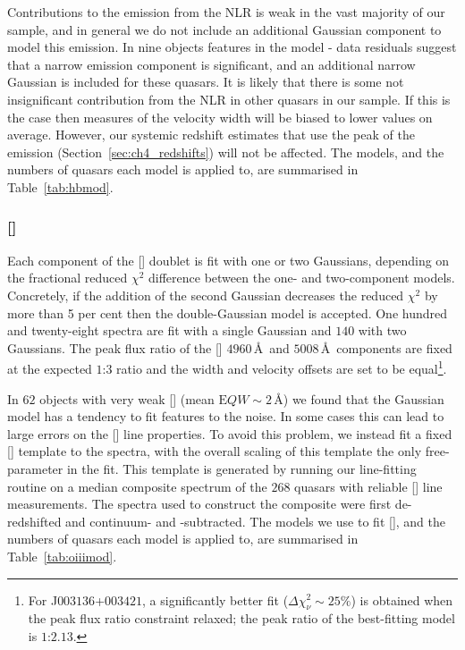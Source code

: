 Contributions to the \hb emission from the NLR is weak in the vast majority of our sample, and in general we do not include an additional Gaussian component to model this emission. 
In nine objects features in the model - data residuals suggest that a narrow emission component is significant, and an additional narrow Gaussian is included for these quasars. 
It is likely that there is some not insignificant contribution from the NLR in other quasars in our sample. 
If this is the case then measures of the \hb velocity width will be biased to lower values on average. 
However, our systemic redshift estimates that use the peak of the \hb emission (Section~\ref{sec:ch4_redshifts}) will not be affected. 
The \hb models, and the numbers of quasars each model is applied to, are summarised in Table~\ref{tab:hbmod}. 

\subsubsection{[]}

Each component of the [] doublet is fit with one or two Gaussians, depending on the fractional reduced $\chi^2$ difference between the one- and two-component models. 
Concretely, if the addition of the second Gaussian decreases the reduced $\chi^2$ by more than 5 per cent then the double-Gaussian model is accepted.
One hundred and twenty-eight spectra are fit with a single Gaussian and $140$ with two Gaussians. 
The peak flux ratio of the [] $4960$\,\AA\, and $5008$\,\AA\, components are fixed at the expected $1$:$3$ ratio and the width and velocity offsets are set to be equal\footnote{For J$003136$+$003421$, a significantly better fit ($\Delta \chi^2_{\nu} \sim 25\%$) is obtained when the peak flux ratio constraint relaxed; the peak ratio of the best-fitting model is $1$:$2.13$.}.

In $62$ objects with very weak [] (mean ${\mathrm EQW}\sim2$\,\AA) we found that the Gaussian model has a tendency to fit features to the noise. 
In some cases this can lead to large errors on the [] line properties. 
To avoid this problem, we instead fit a fixed [] template to the spectra, with the overall scaling of this template the only free-parameter in the fit.
This template is generated by running our line-fitting routine on a median composite spectrum of the $268$ quasars with reliable [] line measurements.  
The spectra used to construct the composite were first de-redshifted and continuum- and -subtracted.  
The models we use to fit [], and the numbers of quasars each model is applied to, are summarised in Table~\ref{tab:oiiimod}.

